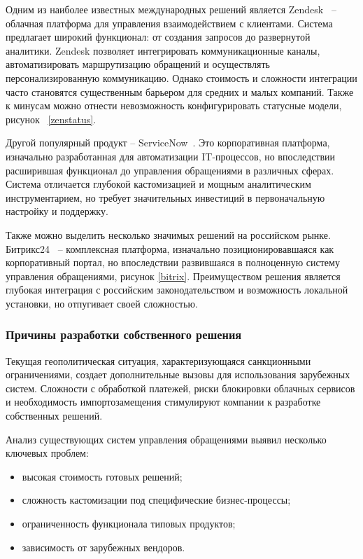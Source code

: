 Одним из наиболее известных международных решений является Zendesk~\cite{Zendesk} – облачная платформа для управления взаимодействием с клиентами. Система предлагает широкий функционал: от создания запросов до развернутой аналитики. Zendesk позволяет интегрировать коммуникационные каналы, автоматизировать маршрутизацию обращений и осуществлять персонализированную коммуникацию. Однако стоимость и сложности интеграции часто становятся существенным барьером для средних и малых компаний. Также к минусам можно отнести невозможность конфигурировать статусные модели, рисунок ~\ref{zenstatus}.


Другой популярный продукт – ServiceNow~\cite{ServiceNow}. Это корпоративная платформа, изначально разработанная для автоматизации IT-процессов, но впоследствии расширившая функционал до управления обращениями в различных сферах. Система отличается глубокой кастомизацией и мощным аналитическим инструментарием, но требует значительных инвестиций в первоначальную настройку и поддержку.



Также можно выделить несколько значимых решений на российском рынке. Битрикс24~\cite{bitrix} – комплексная платформа, изначально позиционировавшаяся как корпоративный портал, но впоследствии развившаяся в полноценную систему управления обращениями, рисунок \ref{bitrix}. Преимуществом решения является глубокая интеграция с российским законодательством и возможность локальной установки, но отпугивает своей сложностью.


\subsubsection{Причины разработки собственного решения}

Текущая геополитическая ситуация, характеризующаяся санкционными ограничениями, создает дополнительные вызовы для использования зарубежных систем. Сложности с обработкой платежей, риски блокировки облачных сервисов и необходимость импортозамещения стимулируют компании к разработке собственных решений.

Анализ существующих систем управления обращениями выявил несколько ключевых проблем:

\begin{itemize}
    \item высокая стоимость готовых решений;
    \item сложность кастомизации под специфические бизнес-процессы;
    \item ограниченность функционала типовых продуктов;
    \item зависимость от зарубежных вендоров.
\end{itemize}

